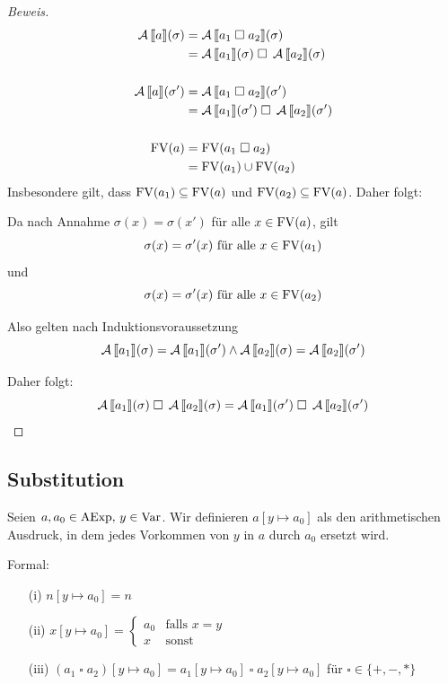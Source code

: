 \begin{proof}[Beweis]
    \begin{align*}
        \A\lsem a \rsem(\sigma) & = \A\lsem a_1 \;\square\; a_2 \rsem(\sigma) \\
        & = \A\lsem a_1 \rsem(\sigma) \;\square\; \A\lsem a_2 \rsem(\sigma) \\
        \\
        \A\lsem a \rsem(\sigma') & = \A\lsem a_1 \;\square\; a_2 \rsem(\sigma') \\
        & = \A\lsem a_1 \rsem(\sigma') \;\square\; \A\lsem a_2 \rsem(\sigma') \\
        \\
        \FV(a) & = \FV(a_1 \;\square\; a_2) \\
        & = \FV(a_1) \cup \FV(a_2)
    \end{align*}
    Insbesondere gilt, dass $\operatorname{FV}(a_1) \subseteq \operatorname{FV}(a)$ und $\operatorname{FV}(a_2) \subseteq \operatorname{FV}(a)$. Daher folgt:

    Da nach Annahme $\sigma(x) = \sigma(x')$ für alle $x \in \operatorname{FV}(a)$, gilt
    \[
    \sigma(x) = \sigma'(x) \text{ für alle } x \in \operatorname{FV}(a_1)
    \]
    und
    \[
    \sigma(x) = \sigma'(x) \text{ für alle } x \in \operatorname{FV}(a_2)
    \]

    Also gelten nach Induktionsvoraussetzung
    \[
    \operatorname{\mathcal{A}}\mathrm{[}\kern-.14em\mathrm{[} a_1 \mathrm{]}\kern-.14em\mathrm{]}(\sigma) = \operatorname{\mathcal{A}}\mathrm{[}\kern-.14em\mathrm{[} a_1 \mathrm{]}\kern-.14em\mathrm{]}(\sigma') \wedge \operatorname{\mathcal{A}}\mathrm{[}\kern-.14em\mathrm{[} a_2 \mathrm{]}\kern-.14em\mathrm{]}(\sigma) = \operatorname{\mathcal{A}}\mathrm{[}\kern-.14em\mathrm{[} a_2 \mathrm{]}\kern-.14em\mathrm{]}(\sigma')
    \]

    Daher folgt:
    \[
    \operatorname{\mathcal{A}}\mathrm{[}\kern-.14em\mathrm{[} a_1 \mathrm{]}\kern-.14em\mathrm{]}(\sigma) \;\square\; \operatorname{\mathcal{A}}\mathrm{[}\kern-.14em\mathrm{[} a_2 \mathrm{]}\kern-.14em\mathrm{]}(\sigma) = \operatorname{\mathcal{A}}\mathrm{[}\kern-.14em\mathrm{[} a_1 \mathrm{]}\kern-.14em\mathrm{]}(\sigma') \;\square\; \operatorname{\mathcal{A}}\mathrm{[}\kern-.14em\mathrm{[} a_2 \mathrm{]}\kern-.14em\mathrm{]}(\sigma')
    \]
\end{proof}



\subsection{Substitution}\label{section:substitution}

\begin{definition} \label{def:substitutionExp}
    Seien $a, a_0 \in \operatorname{AExp}, \, y \in \operatorname{Var}$. Wir definieren $a[y \mapsto a_0]$ als den arithmetischen Ausdruck, in dem jedes Vorkommen von $y$ in $a$ durch $a_0$ ersetzt wird.

    Formal:
    \begin{enumerate}
        \item[(i)] $n[y \mapsto a_0] = n$
        \item[(ii)] $x[y \mapsto a_0] = \begin{cases} a_0 & \text{falls } x = y \\ x & \text{sonst} \end{cases}$
        \item[(iii)] $(a_1 \;\square\; a_2)[y \mapsto a_0] = a_1[y \mapsto a_0] \;\square\; a_2[y \mapsto a_0]$ \quad\quad für $\square \in \{ +, -, * \}$
    \end{enumerate}
\end{definition}

